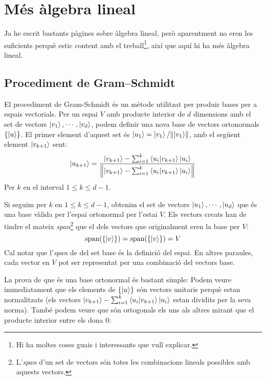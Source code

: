\chapter{Més àlgebra lineal}
Ja he escrit bastants pàgines sobre àlgebra lineal, però aparentment no eren les suficients perquè estic content amb el treball\footnote{Hi ha moltes coses guais i interessants que vull explicar.}, així que aquí hi ha més àlgebra lineal.


\section{Procediment de Gram–Schmidt}\label{gram}
El procediment de Gram-Schmidt és un mètode utilitzat per produir bases per a espais vectorials\cite{QCandQI:GramSchmidt}. Per un espai $V$ amb producte interior de $d$ dimensions amb el set de vectors ${\ket{v_1}, \cdots, \ket{v_d}}$, podem definir una nova base de vectors ortonormals $\{\ket{u}\}$. El primer element d'aquest set és $\ket{u_1} = \ket{v_1}/\norm{\ket{v_1}}$, amb el següent element $\ket{v_{k+1}}$ sent:
$$
\ket{u_{k+1}} = \frac{\ket{v_{k+1}} - \sum_{i=1}^{k} \bra{u_i}\ket{v_{k+1}}\ket{u_i}}{\norm{\ket{v_{k+1}} - \sum_{i=1}^{k} \bra{u_i}\ket{v_{k+1}}\ket{u_i}}}
$$
Per $k$ en el interval $1 \leq k \leq d-1$.

Si seguim per $k$ en $1 \leq k \leq d-1$, obtenim el set de vectors ${\ket{u_1}, \cdots , \ket{u_d}}$ que és una base vàlida per l'espai ortonormal per l'estai $V$. Els vectors creats han de tindre el mateix \textit{span}\footnote{L'\textit{span} d'un set de vectors són totes les combinacions lineals possibles amb aquests vectors.} que el dels vectors que originalment eren la base per $V$:
$$
\text{span}(\{\ket{v}\}) = \text{span}(\{\ket{v}\}) = V
$$
Cal notar que l'\textit{span} de del set base és la definició del espai. En altres paraules, cada vector en $V$ pot ser representat per una combinació del vectors base. 

La prova de que és una base ortonormal és bastant simple:
Podem veure immediatament que els elements de $\{ \ket{u} \}$ són vectors unitaris perquè estan normalitzats (els vectors $\ket{v_{k+1}} - \sum_{i=1}^{k} \bra{u_i}\ket{v_{k+1}}\ket{u_i}$ estan dividits per la seva norma). També podem veure que són ortogonals els uns als altres mirant que el producte interior entre els dona 0:

